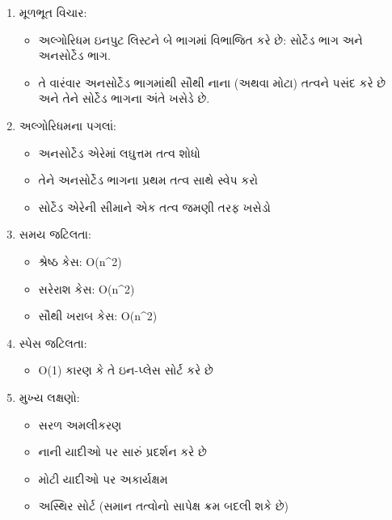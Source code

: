 \begin{enumerate}
\def\labelenumi{\arabic{enumi}.}
\tightlist
\item
  મૂળભૂત વિચાર:

  \begin{itemize}
  \tightlist
  \item
    અલ્ગોરિધમ ઇનપુટ લિસ્ટને બે ભાગમાં વિભાજિત કરે છે: સોર્ટેડ ભાગ અને અનસોર્ટેડ ભાગ.
  \item
    તે વારંવાર અનસોર્ટેડ ભાગમાંથી સૌથી નાના (અથવા મોટા) તત્વને પસંદ કરે છે અને તેને
    સોર્ટેડ ભાગના અંતે ખસેડે છે.
  \end{itemize}
\item
  અલ્ગોરિધમના પગલાં:

  \begin{itemize}
  \tightlist
  \item
    અનસોર્ટેડ એરેમાં લઘુત્તમ તત્વ શોધો
  \item
    તેને અનસોર્ટેડ ભાગના પ્રથમ તત્વ સાથે સ્વેપ કરો
  \item
    સોર્ટેડ એરેની સીમાને એક તત્વ જમણી તરફ ખસેડો
  \end{itemize}
\item
  સમય જટિલતા:

  \begin{itemize}
  \tightlist
  \item
    શ્રેષ્ઠ કેસ: O(n\^{}2)
  \item
    સરેરાશ કેસ: O(n\^{}2)
  \item
    સૌથી ખરાબ કેસ: O(n\^{}2)
  \end{itemize}
\item
  સ્પેસ જટિલતા:

  \begin{itemize}
  \tightlist
  \item
    O(1) કારણ કે તે ઇન-પ્લેસ સોર્ટ કરે છે
  \end{itemize}
\item
  મુખ્ય લક્ષણો:

  \begin{itemize}
  \tightlist
  \item
    સરળ અમલીકરણ
  \item
    નાની યાદીઓ પર સારું પ્રદર્શન કરે છે
  \item
    મોટી યાદીઓ પર અકાર્યક્ષમ
  \item
    અસ્થિર સોર્ટ (સમાન તત્વોનો સાપેક્ષ ક્રમ બદલી શકે છે)
  \end{itemize}
\end{enumerate}

